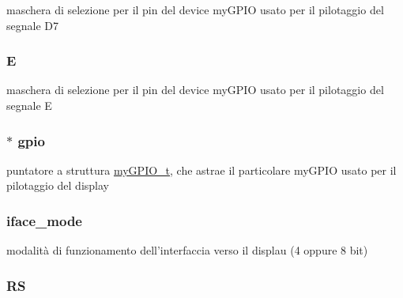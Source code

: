 maschera di selezione per il pin del device my\+G\+P\+I\+O usato per il pilotaggio del segnale D7 \hypertarget{struct_h_d44780___l_c_d__t_aafe8aa696cf0ea45fd710809360b974a}{
\subsubsection[{E}]{ E}}\label{struct_h_d44780___l_c_d__t_aafe8aa696cf0ea45fd710809360b974a}
maschera di selezione per il pin del device my\+G\+P\+I\+O usato per il pilotaggio del segnale E \hypertarget{struct_h_d44780___l_c_d__t_ac37ddc7c58d246d233dfb38037020184}{
\subsubsection[{gpio}]{$\ast$ gpio}}\label{struct_h_d44780___l_c_d__t_ac37ddc7c58d246d233dfb38037020184}
puntatore a struttura \hyperlink{structmy_g_p_i_o__t}{my\+G\+P\+I\+O\+\_\+t}, che astrae il particolare my\+G\+P\+I\+O usato per il pilotaggio del display \hypertarget{struct_h_d44780___l_c_d__t_a7c5a51b8cc5de5ee2cf42b884bd1bc67}{
\subsubsection[{iface\+\_\+mode}]{ iface\+\_\+mode}}\label{struct_h_d44780___l_c_d__t_a7c5a51b8cc5de5ee2cf42b884bd1bc67}
modalità di funzionamento dell'interfaccia verso il displau (4 oppure 8 bit) \hypertarget{struct_h_d44780___l_c_d__t_a120bc0a069f764630359d9655fe0c46d}{
\subsubsection[{R\+S}]{ R\+S}}\label{struct_h_d44780___l_c_d__t_a120bc0a069f764630359d9655fe0c46d}
